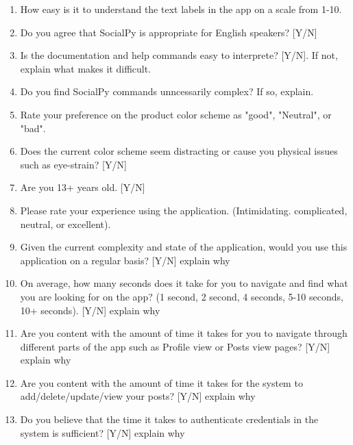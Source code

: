 \documentclass[12pt, titlepage]{article}
\begin{document}
\begin{enumerate}
    \item How easy is it to understand the text labels in the app on a scale from 1-10.
    \item Do you agree that SocialPy is appropriate for English speakers? [Y/N]
    \item Is the documentation and help commands easy to interprete? [Y/N]. If not, explain what makes it difficult.
    \item Do you find SocialPy commands unncessarily complex? If so, explain.
    \item Rate your preference on the product color scheme as "good", "Neutral", or "bad".
    \item Does the current color scheme seem distracting or cause you physical issues such as eye-strain? [Y/N]
    \item Are you 13+ years old. [Y/N]
    \item Please rate your experience using the application. (Intimidating. complicated, neutral, or excellent).
    \item  Given the current complexity and state of the application, would you use this application on a regular basis? [Y/N] explain why
    \item On average, how many seconds does it take for you to navigate and find what you are looking for on the app? (1 second, 2 second, 4 seconds, 5-10 seconds, 10+ seconds). [Y/N] explain why
    \item Are you content with the amount of time it takes for you to navigate through different parts of the app such as Profile view or Posts view pages? [Y/N] explain why
    \item Are you content with the amount of time it takes for the system to add/delete/update/view your posts? [Y/N] explain why
    \item Do you believe that the time it takes to authenticate credentials in the system is sufficient? [Y/N] explain why
\end{enumerate}
\end{document}
